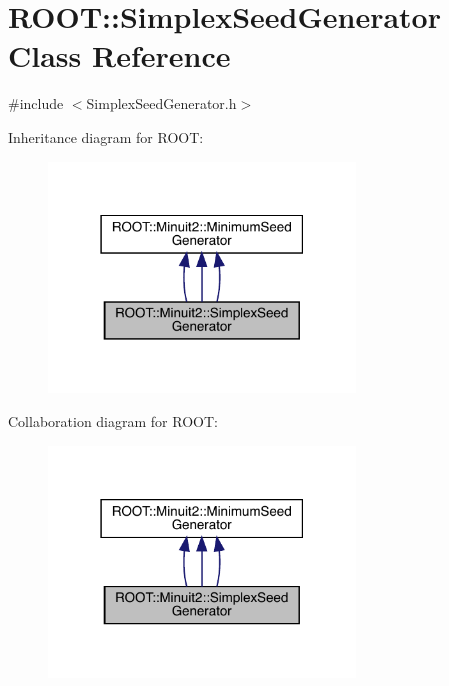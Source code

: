 \hypertarget{classROOT_1_1Minuit2_1_1SimplexSeedGenerator}{}\section{R\+O\+OT\+:\+:Simplex\+Seed\+Generator Class Reference}
\label{classROOT_1_1Minuit2_1_1SimplexSeedGenerator}


{\ttfamily \#include $<$Simplex\+Seed\+Generator.\+h$>$}



Inheritance diagram for R\+O\+OT\+:
\nopagebreak
\begin{figure}[H]
\begin{center}
\leavevmode
\includegraphics[width=231pt]{d2/da8/classROOT_1_1Minuit2_1_1SimplexSeedGenerator__inherit__graph}
\end{center}
\end{figure}


Collaboration diagram for R\+O\+OT\+:
\nopagebreak
\begin{figure}[H]
\begin{center}
\leavevmode
\includegraphics[width=231pt]{da/d52/classROOT_1_1Minuit2_1_1SimplexSeedGenerator__coll__graph}
\end{center}
\end{figure}
